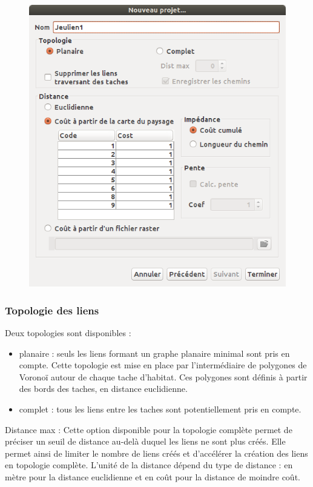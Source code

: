 \documentclass{article}
\begin{document}
\begin{figure}[H]
	\includegraphics[scale=0.5]{img/manual-fr_img4.png} 
\end{figure}

\subsubsection{Topologie des liens}

Deux topologies sont disponibles :
\begin{itemize}
	\item planaire : seuls les liens formant un graphe planaire minimal sont pris en compte. Cette topologie est mise en place par l’intermédiaire de polygones de Voronoï autour de chaque tache d’habitat. Ces polygones sont définis à partir des bords des taches, en distance euclidienne.
	\item complet : tous les liens entre les taches sont potentiellement pris en compte.
\end{itemize}

Distance max : Cette option disponible pour la topologie complète permet de préciser un seuil de distance au-delà duquel les liens ne sont plus créés. Elle permet ainsi de limiter le nombre de liens créés et d’accélérer la création des liens en topologie complète. L'unité de la distance dépend du type de distance : en mètre pour la distance euclidienne et en coût pour la distance de moindre coût.
\end{document}

